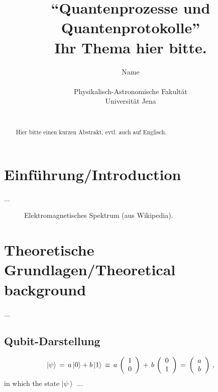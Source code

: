 \documentclass[11pt]{article}
\def\ketm#1{     \left\vert   #1 \right\rangle   }
\begin{document}
\title{\textbf{``Quantenprozesse und Quantenprotokolle''} \\[0.1cm]
       Ihr Thema hier bitte.}

\author{Name          \\
        \\
	Physikalisch-Astronomische Fakult\"a{}t \\[0.1cm]
        Universit\"a{}t Jena \\[0.1cm]
        \\
        }


\maketitle

\begin{abstract}
Hier bitte einen kurzen Abstrakt, evtl. auch auf Englisch.
\end{abstract}

\bigskip
\bigskip


%
%
%
%
%
\section{Einf\"u{}hrung/Introduction}

...


%
%
%
%
%
\begin{figure}[h]
\begin{center}
  \caption{Elektromagnetisches Spektrum (aus Wikipedia).}
  \label{em-spectrum}
\end{center}
\end{figure}

%
%
%
%
%
\section{Theoretische Grundlagen/Theoretical background}

...


%
%
%
%
\subsection{Qubit-Darstellung}

%
\begin{equation}
   \ketm{\psi} \,=\,  a \ketm{0} + b \ketm{1} \,\equiv\,
   a \,       \left( {\begin{array}{*{20}c} {1 } \\ {0 } \end{array} } \right)
   \,+\, b \, \left( {\begin{array}{*{20}c} {0 } \\ {1 } \end{array} } \right)
   \,=\,
   \left( {\begin{array}{*{20}c}
   {a }  \\
   {b }  \\
   \end{array} } \right) \, ,
\end{equation}
%
in which the state $\ketm{\psi}$ ...
\end{document}

